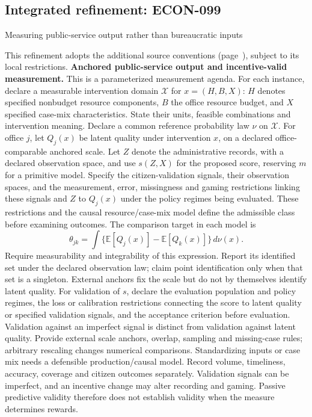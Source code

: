 \documentclass[11pt,a4paper]{article}
\begin{document}
\subsection*{Integrated refinement: ECON-099}
{\sffamily\small\color{muted}Measuring public-service output rather than bureaucratic inputs\par}
This refinement adopts the additional source conventions
(page~\pageref{audited:conventions}), subject to its local restrictions.
\textbf{Anchored public-service output and incentive-valid measurement.}
This is a parameterized measurement agenda. For each instance, declare a
measurable intervention domain $\mathcal X$ for $x=(H,B,X)$: $H$ denotes
specified nonbudget resource components, $B$ the office resource budget, and
$X$ specified case-mix characteristics. State their units, feasible combinations
and intervention meaning. Declare a common reference probability law $\nu$ on
$\mathcal X$. For office $j$, let $Q_j(x)$ be latent quality under intervention
$x$, on a declared office-comparable anchored scale. Let $Z$ denote the
administrative records, with a declared observation space, and use $s(Z,X)$
for the proposed score, reserving $m$ for a primitive model. Specify the
citizen-validation signals, their observation spaces, and the measurement,
error, missingness and gaming restrictions linking these signals and $Z$ to
$Q_j(x)$ under the policy regimes being evaluated. These restrictions and the
causal resource/case-mix model define the admissible class before examining
outcomes. The comparison target in each model is
\[
\theta_{jk}=\int\{\mathbb E[Q_j(x)]-\mathbb E[Q_k(x)]\}\,d\nu(x).
\]
Require measurability and integrability of this expression. Report its
identified set under the declared observation law; claim point identification
only when that set is a singleton. External anchors fix the scale but do not
by themselves identify latent quality. For validation of $s$, declare the
evaluation population and policy regimes, the loss or calibration restrictions
connecting the score to latent quality or specified validation signals, and
the acceptance criterion before evaluation. Validation against an imperfect
signal is distinct from validation against latent quality.
Provide external scale anchors, overlap, sampling and missing-case rules;
arbitrary rescaling changes numerical comparisons. Standardizing inputs or case
mix needs a defensible production/causal model. Record volume, timeliness,
accuracy, coverage and citizen outcomes separately. Validation signals can be
imperfect, and an incentive change may alter recording and gaming. Passive
predictive validity therefore does not establish validity when the measure
determines rewards.
\end{document}
